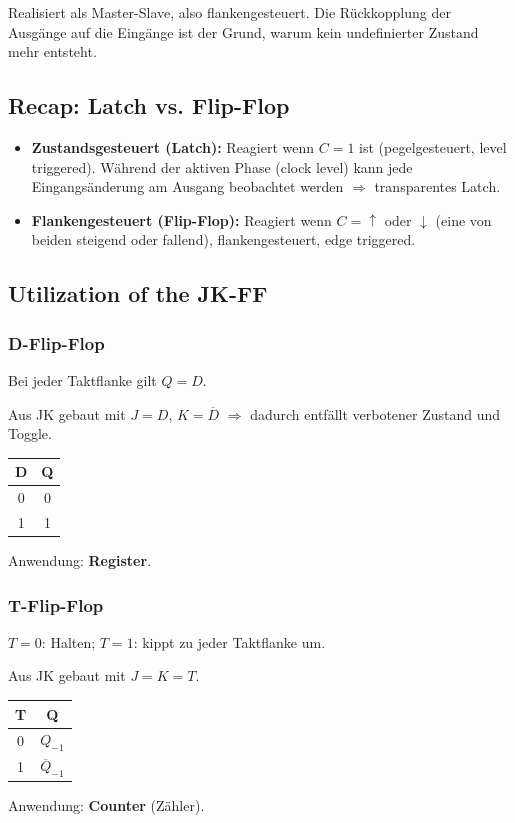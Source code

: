 \documentclass[11pt,a4paper]{article}
\begin{document}
Realisiert als Master-Slave, also flankengesteuert. Die Rückkopplung der Ausgänge auf die Eingänge ist der Grund, warum kein undefinierter Zustand mehr entsteht.

\subsection{Recap: Latch vs. Flip-Flop}
\begin{itemize}
    \item \textbf{Zustandsgesteuert (Latch):} Reagiert wenn $C = 1$ ist (pegelgesteuert, level triggered). Während der aktiven Phase (clock level) kann jede Eingangsänderung am Ausgang beobachtet werden $\Rightarrow$ transparentes Latch.
    \item \textbf{Flankengesteuert (Flip-Flop):} Reagiert wenn $C = \uparrow$ oder $\downarrow$ (eine von beiden steigend oder fallend), flankengesteuert, edge triggered.
\end{itemize}

\subsection{Utilization of the JK-FF}

\subsubsection{D-Flip-Flop}
Bei jeder Taktflanke gilt $Q = D$.

Aus JK gebaut mit $J = D$, $K = \overline{D}$ $\Rightarrow$ dadurch entfällt verbotener Zustand und Toggle.

\begin{center}
\begin{tabular}{cc}
    D & Q \\ \hline
    0 & 0 \\
    1 & 1 \\
\end{tabular}
\end{center}
Anwendung: \textbf{Register}.

\subsubsection{T-Flip-Flop}
$T=0$: Halten; $T=1$: kippt zu jeder Taktflanke um.

Aus JK gebaut mit $J = K = T$.

\begin{center}
\begin{tabular}{cc}
    T & Q \\ \hline
    0 & $Q_{-1}$ \\
    1 & $\overline{Q}_{-1}$ \\
\end{tabular}
\end{center}
Anwendung: \textbf{Counter} (Zähler).
\end{document}
